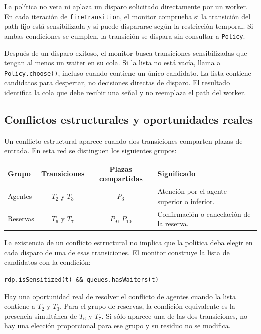 \documentclass[11pt,a4paper]{article}
\begin{document}
La política no veta ni aplaza un disparo solicitado directamente por un worker. En cada iteración de \texttt{fireTransition}, el monitor comprueba si la transición del path fijo está sensibilizada y si puede dispararse según la restricción temporal. Si ambas condiciones se cumplen, la transición se dispara sin consultar a \texttt{Policy}.

Después de un disparo exitoso, el monitor busca transiciones sensibilizadas que tengan al menos un waiter en su cola. Si la lista no está vacía, llama a \texttt{Policy.choose()}, incluso cuando contiene un único candidato. La lista contiene candidatos para despertar, no decisiones directas de disparo. El resultado identifica la cola que debe recibir una señal y no reemplaza el path del worker.

\subsection{Conflictos estructurales y oportunidades reales}

Un conflicto estructural aparece cuando dos transiciones comparten plazas de entrada. En esta red se distinguen los siguientes grupos:

\begin{table}[H]
\centering
\begin{tabularx}{\textwidth}{l c c X}
\toprule
\textbf{Grupo} & \textbf{Transiciones} & \textbf{Plazas compartidas} & \textbf{Significado} \\
Agentes & $T_2$ y $T_3$ & $P_3$ & Atención por el agente superior o inferior. \\
Reservas & $T_6$ y $T_7$ & $P_9$, $P_{10}$ & Confirmación o cancelación de la reserva. \\
\bottomrule
\end{tabularx}
\end{table}

La existencia de un conflicto estructural no implica que la política deba elegir en cada disparo de una de esas transiciones. El monitor construye la lista de candidatos con la condición:

\begin{lstlisting}[frame=single]
rdp.isSensitized(t) && queues.hasWaiters(t)
\end{lstlisting}

Hay una oportunidad real de resolver el conflicto de agentes cuando la lista contiene a $T_2$ y $T_3$. Para el grupo de reservas, la condición equivalente es la presencia simultánea de $T_6$ y $T_7$. Si sólo aparece una de las dos transiciones, no hay una elección proporcional para ese grupo y su residuo no se modifica.
\end{document}
